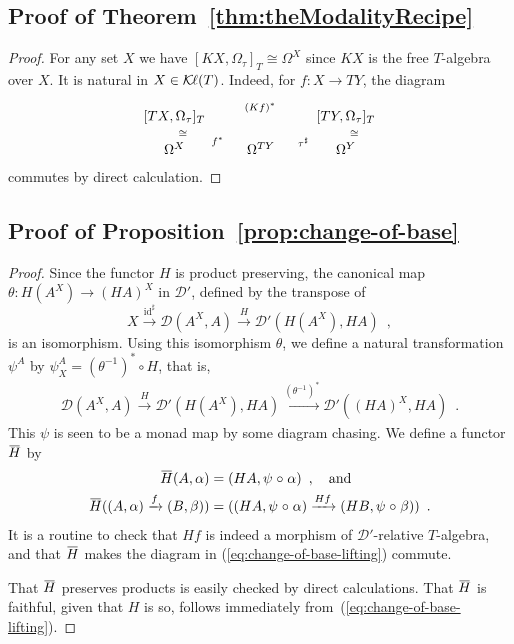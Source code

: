 \documentclass[9pt, preprint]{sigplanconf}
\theoremstyle{theorem}
\theoremstyle{definition}
\newcommand{\cat}[1]{\mathcal{#1}}
\renewcommand{\bar}{\overbar}
\newcommand{\overbar}[1]{\mkern 1.5mu\overline{\mkern-1.5mu#1\mkern-1.5mu}\mkern 1.5mu}
\newcommand{\xxto}{\xrightarrow}
\newcommand{\id}{\mathrm{id}}
\newcommand{\Kl}{\mathcal{K}{\kern-.2ex}\ell}
\DeclarePairedDelimiter\p{(}{)}
\newcommand{\after}{\mathrel{\circ}}
\newcommand{\co}{\mathrel{\circ}}
\begin{document}
\subsection{Proof of Theorem~\ref{thm:theModalityRecipe}}
\begin{proof}
  For any set $X$ we have $[KX, \Omega_{\tau}]_T \cong \Omega^X$
  since $KX$ is the free $T$-algebra over $X$.
  It is natural in $X \in \Kl(T)$. Indeed, for $f \colon X \to TY$,
  the  diagram
  \begin{align*}
    \xymatrix@R-1.5em{
      [TX, \Omega_{\tau}]_{T} \ar[d]^{\cong}
      && [TY, \Omega_{\tau}]_{T} \ar[ll]_{(Kf)^*} \ar[d]^{\cong} \\
      \Omega^X
      & \Omega^{TY} \ar[l]_{f^*}
      & \Omega^{Y} \ar[l]_{\tau^{\sharp}}
    }
  \end{align*}
commutes by direct calculation.
\end{proof}
\subsection{Proof of Proposition~\ref{prop:change-of-base}}
\begin{proof}
  Since the functor $H$ is product preserving,
  the canonical map $\theta \colon H(A^X) \to (HA)^X$ in
  $\cat{D'}$, defined by the transpose of
\begin{equation}\label{eq:change-of-base}
    X \xxto{\id^{\sharp}} \cat{D}(A^X, A)
      \xxto{H} \cat{D'}(H(A^X), HA) \enspace ,
  \end{equation}
 is an isomorphism.
  Using this isomorphism $\theta$,
  we define a natural transformation $\psi^A$ by
  $\psi^A_X = (\theta^{-1})^* \co H$, that is,
\begin{align*}
     \cat{D}(A^{X}, A)
      \xxto{H} \cat{D'}(H(A^{X}), HA)
      \xxto{(\theta^{-1})^*} \cat{D'}((HA)^{X}, HA)
   \enspace.
  \end{align*}
  This $\psi$ is  seen to be
  a monad map by some diagram chasing.
  We define a functor $\bar{H}$ by
  \begin{align*}
    \bar{H} \p*{A, \alpha} &= \p*{HA, \psi \after \alpha}
        \enspace, \quad\text{and} \\
    \bar{H} ((A, \alpha) \xxto{f} (B, \beta)) &=
        ((HA, \psi \after \alpha) \xxto{Hf} (HB, \psi \after \beta))
        \enspace .
  \end{align*}
  It is a routine to check that
$Hf$ is indeed a morphism of $\cat{D'}$-relative $T$-algebra,
  and that $\bar{H}$ makes the diagram in
 (\ref{eq:change-of-base-lifting}) commute.

 That $\bar{H}$ preserves products is easily checked by direct
 calculations. That $\bar{H}$ is faithful, given that $H$ is so, follows
 immediately from~(\ref{eq:change-of-base-lifting}).
\end{proof}
\end{document}
